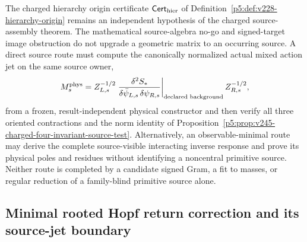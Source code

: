 \documentclass[12pt,a4paper]{article}
\begin{document}
\begin{remark}
\label{p5:rem:charged-origin-two-route-test}
The charged hierarchy origin certificate
\(\mathsf{Cert}_{\rm hier}\) of
Definition~\ref{p5:def:v228-hierarchy-origin} remains an independent
hypothesis of the charged source-assembly theorem. The mathematical
source-algebra no-go and signed-target image obstruction do not
upgrade a geometric matrix to an occurring source.
A direct source route must compute the canonically normalized actual
mixed action jet on the same source owner,
\[
 M_s^{\rm phys}=Z_{L,s}^{-1/2}
 \left.\frac{\delta^2S_*}{\delta\bar\psi_{L,s}\,\delta\psi_{R,s}}
 \right|_{\text{declared background}}Z_{R,s}^{-1/2},
\]
from a frozen, result-independent physical constructor and then
verify all three oriented contractions and the norm identity of
Proposition~\ref{p5:prop:v245-charged-four-invariant-source-test}.
Alternatively, an observable-minimal route may derive the complete
source-visible interacting inverse response and prove its physical
poles and residues without identifying a noncentral primitive source.
Neither route is completed by a candidate signed Gram, a fit to masses,
or regular reduction of a family-blind primitive source alone.
\end{remark}


\subsection{Minimal rooted Hopf return correction and its source-jet boundary}
\label{p5:sec:v3218-rooted-two-contact-return}
\end{document}
